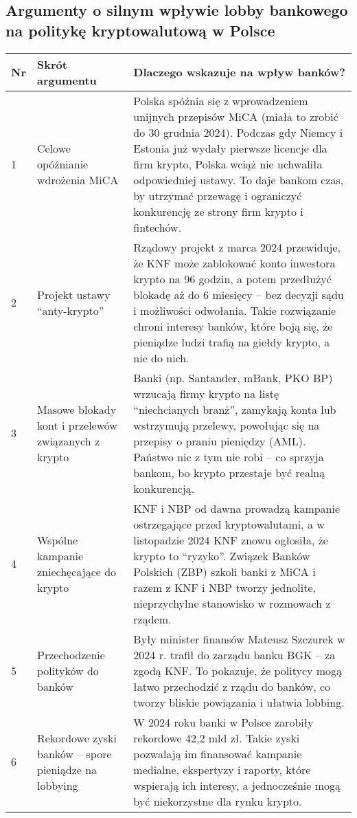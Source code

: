 \documentclass[9pt]{article}
\begin{document}
	
	\subsection*{ Argumenty o silnym wpływie lobby bankowego na politykę kryptowalutową w Polsce}
		\vspace{2em}
	
	\renewcommand{\arraystretch}{1.3}
	\begin{tabular}{@{} p{0.3cm} p{6cm} p{12cm} @{}}
		\toprule
		\textbf{Nr} & \textbf{Skrót argumentu} & \textbf{Dlaczego wskazuje na wpływ banków?} \\
		\midrule
		1 & Celowe opóźnianie wdrożenia MiCA & Polska spóźnia się z wprowadzeniem unijnych przepisów MiCA (miała to zrobić do 30 grudnia 2024). Podczas gdy Niemcy i Estonia już wydały pierwsze licencje dla firm krypto, Polska wciąż nie uchwaliła odpowiedniej ustawy. To daje bankom czas, by utrzymać przewagę i ograniczyć konkurencję ze strony firm krypto i fintechów. \\
		
		2 & Projekt ustawy “anty-krypto” & Rządowy projekt z marca 2024 przewiduje, że KNF może zablokować konto inwestora krypto na 96 godzin, a potem przedłużyć blokadę aż do 6 miesięcy – bez decyzji sądu i możliwości odwołania. Takie rozwiązanie chroni interesy banków, które boją się, że pieniądze ludzi trafią na giełdy krypto, a nie do nich. \\
		
		3 & Masowe blokady kont i przelewów związanych z krypto & Banki (np. Santander, mBank, PKO BP) wrzucają firmy krypto na listę “niechcianych branż”, zamykają konta lub wstrzymują przelewy, powołując się na przepisy o praniu pieniędzy (AML). Państwo nic z tym nie robi – co sprzyja bankom, bo krypto przestaje być realną konkurencją. \\
		
		4 & Wspólne kampanie zniechęcające do krypto & KNF i NBP od dawna prowadzą kampanie ostrzegające przed kryptowalutami, a w listopadzie 2024 KNF znowu ogłosiła, że krypto to “ryzyko”. Związek Banków Polskich (ZBP) szkoli banki z MiCA i razem z KNF i NBP tworzy jednolite, nieprzychylne stanowisko w rozmowach z rządem. \\
		
		5 & Przechodzenie polityków do banków & Były minister finansów Mateusz Szczurek w 2024 r. trafił do zarządu banku BGK – za zgodą KNF. To pokazuje, że politycy mogą łatwo przechodzić z rządu do banków, co tworzy bliskie powiązania i ułatwia lobbing. \\
		
		6 & Rekordowe zyski banków – spore pieniądze na lobbying & W 2024 roku banki w Polsce zarobiły rekordowe 42,2 mld zł. Takie zyski pozwalają im finansować kampanie medialne, ekspertyzy i raporty, które wspierają ich interesy, a jednocześnie mogą być niekorzystne dla rynku krypto. \\
		\bottomrule
	\end{tabular}
		\vspace{2em}
\end{document}
